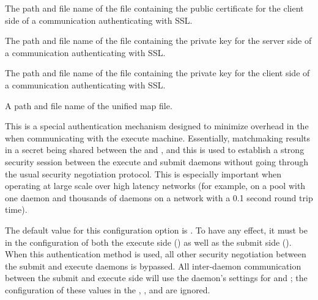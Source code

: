 \begin{description}
\label{param:AuthSSLClientCertfile}
\item[\Macro{AUTH\_SSL\_CLIENT\_CERTFILE}]
  The path and file name of the file containing the public certificate
  for the client side of a communication authenticating with SSL.


\label{param:AuthSSLServerKeyfile}
\item[\Macro{AUTH\_SSL\_SERVER\_KEYFILE}]
  The path and file name of the file containing the private key
  for the server side of a communication authenticating with SSL.

\label{param:AuthSSLClientKeyfile}
\item[\Macro{AUTH\_SSL\_CLIENT\_KEYFILE}]
  The path and file name of the file containing the private key
  for the client side of a communication authenticating with SSL.


\label{param:CertificateMapfile}
\item[\Macro{CERTIFICATE\_MAPFILE}]
  A path and file name of the unified map file.

\label{param:SecEnableMatchPasswordAuthentication}
\item[\Macro{SEC\_ENABLE\_MATCH\_PASSWORD\_AUTHENTICATION}]
  This is a special authentication mechanism designed to minimize
  overhead in the  when communicating with the execute
  machine.  Essentially, matchmaking results in a secret being shared
  between the  and , and this is used to
  establish a strong security session between the execute and submit
  daemons without going through the usual security negotiation protocol.
  This is especially important when operating at large scale over high
  latency networks (for example, on a pool with one  daemon
  and thousands of  daemons on a network with a 0.1 second 
  round trip time).

  The default value for this configuration option is .  To
  have any effect, it must be  in the configuration of both
  the execute side () as well as the submit side 
  ().  When
  this authentication method is used, all other security negotiation
  between the submit and execute daemons is bypassed.  All inter-daemon
  communication between the submit and execute side will use the
   daemon's settings for  and
  ; the configuration of these values in
  the , , and  are ignored.


\end{description}
